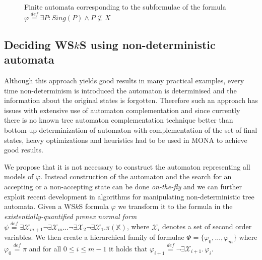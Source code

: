 \documentclass{eeict}
\begin{document}
\begin{figure}
\begin{center}
 \end{center}
 \caption{Finite automata corresponding to the subformulae of the formula
 $\varphi \overset{\mathit{def}}{=} \exists P:
 Sing(P) \wedge P \not\subseteq X$}\label{example}
\end{figure}

\subsection{Deciding WS$k$S using non-deterministic automata}

Although this approach yields good results in many practical examples, every
time non-determinism is introduced the automaton is determinised and the
information about the original states is forgotten. Therefore such an approach
has issues with extensive use of automaton complementation and since currently
there is no known tree automaton complementation technique better than bottom-up determinization of automaton with complementation of the
set of final states, heavy optimizations and heuristics had to be used in MONA
to achieve good results.

We propose that it is not necessary to construct the automaton representing all
models of $\varphi$. Instead construction of the automaton and the search for an
accepting or a non-accepting state can be done \emph{on-the-fly} and we can further exploit
recent development in algorithms for manipulating non-deterministic
tree automata.
Given a WS$k$S formula $\varphi$ we transform it to the formula in the \emph{existentially-quantified prenex normal form} $\psi \overset{\mathit{def}}{=}
\exists\mathcal{X}_{m+1}\neg\exists\mathcal{X}_m\ldots\neg\exists\mathcal{X}_2\neg\exists\mathcal{X}_1.\pi(\mathds{X})$,
where $\mathcal{X}_i$ denotes a set of second order variables.
We then create a hierarchical family of formulae $\Phi =
\{\varphi_0,\ldots,\varphi_m\}$ where $\varphi_0 \overset{\mathit{def}}{=} \pi$ and for all $0 \leq i \leq
m-1$ it holds that $\varphi_{i+1} \overset{\mathit{def}}{=}
\neg\exists\mathcal{X}_{i+1}.\,\varphi_i$.
\end{document}
